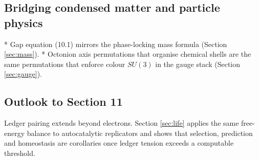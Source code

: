 \subsection{Bridging condensed matter and particle physics}

* Gap equation (10.1) mirrors the phase-locking
  mass formula (Section \ref{sec:mass}).  
* Octonion axis permutations that organise chemical shells are the same
  permutations that enforce colour \(SU(3)\) in the gauge stack
  (Section \ref{sec:gauge}).  

\subsection{Outlook to Section 11}

Ledger pairing extends beyond electrons.  Section \ref{sec:life}
applies the same free-energy balance to autocatalytic replicators and
shows that selection, prediction and homeostasis are corollaries once
ledger tension exceeds a computable threshold.

\clearpage
